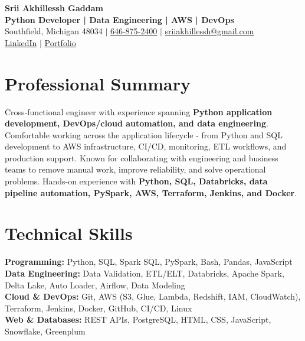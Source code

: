 \documentclass[letterpaper,10pt]{article}
\begin{document}
\fontsize{9.35pt}{10.45pt}\selectfont

\begin{center}
    {\LARGE \textbf{Srii Akhillessh Gaddam}} \\[-1pt]
    \textbf{Python Developer | Data Engineering | AWS | DevOps} \\[2pt]
    Southfield, Michigan 48034 $|$
    \href{tel:6468752400}{646-875-2400} $|$
    \href{mailto:sriiakhillessh@gmail.com}{sriiakhillessh@gmail.com} \\[1pt]
    \href{https://www.linkedin.com/in/srii-akhiilessh-gaddam-b48668191/}{LinkedIn} $|$
    \href{https://sriiakhillesshg.github.io/portfolio/}{Portfolio}
\end{center}
\vspace{-8pt}

\section{Professional Summary}
\small{Cross-functional engineer with experience spanning \textbf{Python application development, DevOps/cloud automation, and data engineering}. Comfortable working across the application lifecycle - from Python and SQL development to AWS infrastructure, CI/CD, monitoring, ETL workflows, and production support. Known for collaborating with engineering and business teams to remove manual work, improve reliability, and solve operational problems. Hands-on experience with \textbf{Python, SQL, Databricks, data pipeline automation, PySpark, AWS, Terraform, Jenkins, and Docker}.}

\section{Technical Skills}
\small{
\textbf{Programming:} Python, SQL, Spark SQL, PySpark, Bash, Pandas, JavaScript \\
\textbf{Data Engineering:} Data Validation, ETL/ELT, Databricks, Apache Spark, Delta Lake, Auto Loader, Airflow, Data Modeling \\
\textbf{Cloud \& DevOps:} Git, AWS (S3, Glue, Lambda, Redshift, IAM, CloudWatch), Terraform, Jenkins, Docker, GitHub, CI/CD, Linux \\
\textbf{Web \& Databases:} REST APIs, PostgreSQL, HTML, CSS, JavaScript, Snowflake, Greenplum
}
\end{document}
